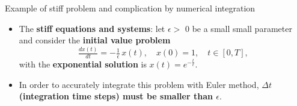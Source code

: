 %
\begin{frame}{Example of stiff problem and complication by numerical integration}
	\small
	\begin{itemize}
		\item The \alert{\bf stiff equations and systems}: 
		let $\epsilon >$ 0 be a small small parameter and  consider the {\bf initial value problem}
		\[
		\tfrac{{d} x(t)}{{d} t} = - \tfrac{1}{\epsilon}\,x(t), \quad 
		x(0) = 1, \quad t \in [0, T],
		\]
		with the \alert{\bf exponential solution} is $x(t) = e^{-\tfrac{t}{\epsilon}}$.
		\pause
		\item In order to accurately integrate this problem with Euler method, {\bf $\Delta t$ (integration time steps) must be smaller than $\epsilon$}.
	\end{itemize}
	\begin{figure}[!t]
		\centering
		 \;
		 \;
	\end{figure}
\end{frame}

